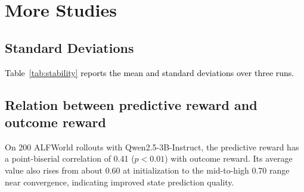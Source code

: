 \documentclass[11pt]{article}
\begin{document}
\section{More Studies}
\label{appx:b}

\subsection{Standard Deviations}
\textcolor{black}{Table~\ref{tab:stability} reports the mean and standard deviations over three runs.}


\subsection{Relation between predictive reward and outcome reward}
On 200 ALFWorld rollouts with Qwen2.5-3B-Instruct, the predictive reward has a point-biserial correlation of 0.41 ($p<0.01$) with outcome reward. Its average value also rises from about 0.60 at initialization to the mid-to-high 0.70 range near convergence, indicating improved state prediction quality.

\begin{table}[t]
\begin{center}
\renewcommand{\arraystretch}{1}
\setlength\tabcolsep{16pt}
\end{center}
\vspace{-0.2cm}
\caption{\textcolor{black}{Stability results over three runs with Qwen2.5-1.5B/7B-Instruct.}}
\label{tab:stability}
\vspace{-0.5cm}
\end{table}
\end{document}
